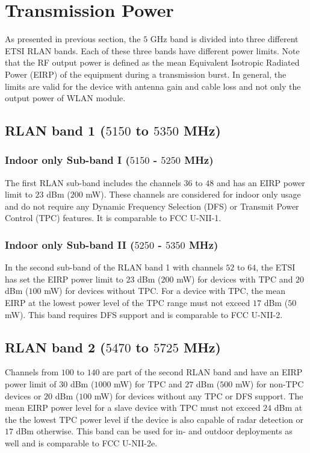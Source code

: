 \section{Transmission Power}

As presented in previous section, the $5$ GHz band is divided into three different ETSI RLAN bands. Each of these three bands have different power limits. Note that the RF output power is defined as the mean Equivalent Isotropic Radiated Power (EIRP) of the equipment during a transmission burst. In general, the limits are valid for the device with antenna gain and cable loss and not only the output power of WLAN module.

\subsection{RLAN band 1 ($5150$ to $5350$ MHz)}

\subsubsection{Indoor only Sub-band I ($5150$ - $5250$ MHz)}
The first RLAN sub-band includes the channels $36$ to $48$ and has an EIRP power limit to $23$ dBm ($200$ mW). These channels are considered for indoor only usage and do not require any Dynamic Frequency Selection (DFS) or Transmit Power Control (TPC) features. It is comparable to FCC U-NII-1.

\subsubsection{Indoor only Sub-band II ($5250$ - $5350$ MHz)}
In the second sub-band of the RLAN band 1 with channels $52$ to $64$, the ETSI has set the EIRP power limit to $23$ dBm ($200$ mW) for devices with TPC and $20$ dBm ($100$ mW) for devices without TPC. For a device with TPC, the mean EIRP at the lowest power level of the TPC range must not exceed $17$ dBm ($50$ mW). This band requires DFS support and is comparable to FCC U-NII-2.

\subsection{RLAN band 2 ($5470$ to $5725$ MHz)}

Channels from $100$ to $140$ are part of the second RLAN band and have an EIRP power limit of $30$ dBm ($1000$ mW) for TPC and $27$ dBm ($500$ mW) for non-TPC devices or $20$ dBm ($100$ mW) for devices without any TPC or DFS support. The mean EIRP power level for a slave device with TPC must not exceed $24$ dBm at the the lowest TPC power level if the device is also capable of radar detection or $17$ dBm otherwise. This band can be used for in- and outdoor deployments as well and is comparable to FCC U-NII-2e.

